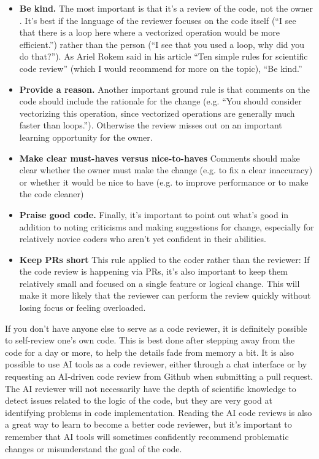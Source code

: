 \begin{itemize}
\item \textbf{Be kind.} The most important is that it's a review of the code, not the owner .  It's best if the language of the reviewer focuses on the code itself (``I see that there is a loop here where a vectorized operation would be more efficient.'') rather than the person (``I see that you used a loop, why did you do that?'').  As Ariel Rokem said in his article ``Ten simple rules for scientific code review'' \citep{Rokem:2024aa} (which I would recommend for more on the topic), ``Be kind.''
\item \textbf{Provide a reason.} Another important ground rule is that comments on the code should include the rationale for the change (e.g. ``You should consider vectorizing this operation, since vectorized operations are generally much faster than loops.''). Otherwise the review misses out on an important learning opportunity for the owner.
\item \textbf{Make clear must-haves versus nice-to-haves} Comments should make clear whether the owner must make the change (e.g. to fix a clear inaccuracy) or whether it would be nice to have (e.g. to improve performance or to make the code cleaner)
\item \textbf{Praise good code.} Finally, it's important to point out what's good in addition to noting criticisms and making suggestions for change, especially for relatively novice coders who aren't yet confident in their abilities.
\item \textbf{Keep PRs short} This rule applied to the coder rather than the reviewer: If the code review is happening via PRs, it's also important to keep them relatively small and focused on a single feature or logical change. This will make it more likely that the reviewer can perform the review quickly without losing focus or feeling overloaded.
\end{itemize}

If you don't have anyone else to serve as a code reviewer, it is definitely possible to self-review one's own code. This is best done after stepping away from the code for a day or more, to help the details fade from memory a bit. It is also possible to use AI tools as a code reviewer, either through a chat interface or by requesting an AI-driven code review from Github when submitting a pull request.  The AI reviewer will not necessarily have the depth of scientific knowledge to detect issues related to the logic of the code, but they are very good at identifying problems in code implementation.  Reading the AI code reviews is also a great way to learn to become a better code reviewer, but it's important to remember that AI tools will sometimes confidently recommend problematic changes or misunderstand the goal of the code.

